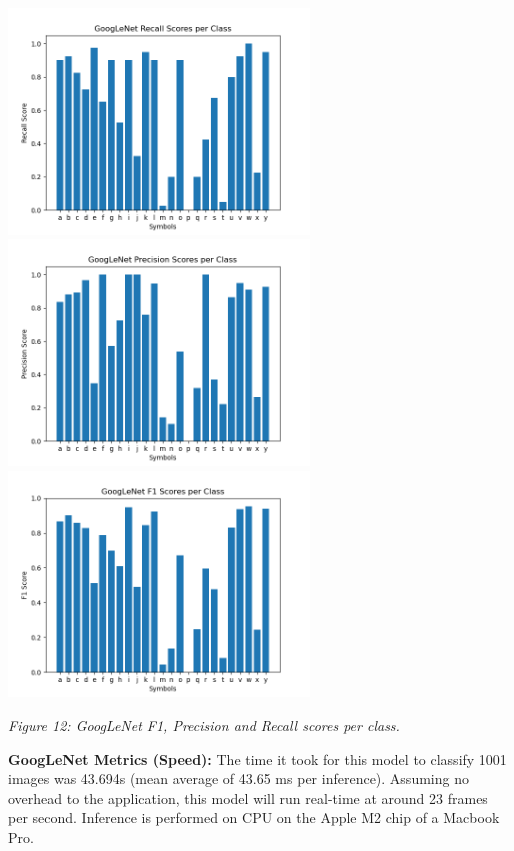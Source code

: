 \documentclass[11pt]{article}
\def\paraskip{\vskip 0.4cm}
\begin{document}
        \begin{center}
            \includegraphics[width=8cm]{images/gnetrecall.png}
            \includegraphics[width=8cm]{images/gnetprec.png}
            \\
            \includegraphics[width=8cm]{images/gnetf1.png}
            \\
            \raggedright \textit{
            Figure 12: GoogLeNet F1, Precision and Recall scores per class.
            }
        \end{center}

        \paraskip

        \noindent\textbf{GoogLeNet Metrics (Speed): }
        The time it took for this model to classify 1001 images was 43.694s (mean average of 43.65 ms per inference). Assuming no overhead to the application, this model will run real-time at around 23 frames per second. Inference is performed on CPU on the Apple M2 chip of a Macbook Pro.
\end{document}
